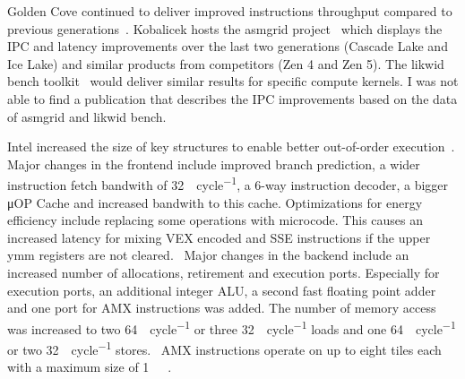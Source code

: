 Golden Cove continued to deliver improved instructions throughput compared to previous generations~\cite{Intel_2021_Architecture_Day}.
Kobalicek hosts the asmgrid project~\cite{Kobalicek_AsmGrid} which displays the \ac{IPC} and latency improvements over the last two generations (Cascade Lake and Ice Lake) and similar products from competitors (Zen 4 and Zen 5).
The likwid bench toolkit~\cite{RHZE_HPC_likwid} would deliver similar results for specific compute kernels.
I was not able to find a publication that describes the \ac{IPC} improvements based on the data of asmgrid and likwid bench.

Intel increased the size of key structures to enable better out-of-order execution~\cite[Sec. 2.4]{Intel_Optimization_Reference_Manual_050}.
Major changes in the frontend include improved branch prediction, a wider instruction fetch bandwith of \SI{32}{\byte\per cycle}, a 6-way instruction decoder, a bigger μOP Cache and increased bandwith to this cache.
Optimizations for energy efficiency include replacing some operations with microcode.
This causes an increased latency for mixing \ac{VEX} encoded and \ac{SSE} instructions if the upper ymm registers are not cleared.~\cite[Sec. 3.11.6]{Intel_Optimization_Reference_Manual_050}
Major changes in the backend include an increased number of allocations, retirement and execution ports.
Especially for execution ports, an additional integer \ac{ALU}, a second fast floating point adder and one port for \ac{AMX} instructions was added.
The number of memory access was increased to two \SI{64}{\byte\per cycle} or three \SI{32}{\byte\per cycle} loads and one \SI{64}{\byte\per cycle} or two \SI{32}{\byte\per cycle} stores.~\cite[Sec. 2.4]{Intel_Optimization_Reference_Manual_050}
\ac{AMX} instructions operate on up to eight tiles each with a maximum size of \SI{1}{\kibi\byte}~\cite[Sec. 20.5.2]{Intel_Optimization_Reference_Manual_050}.

